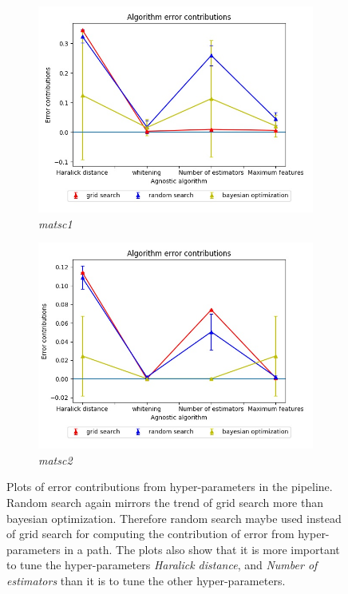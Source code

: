 \begin{figure}[ht!]
\begin{subfigure}{.5\textwidth}
  \centering
  \includegraphics[scale=0.37]{img/EP/agnostic_error_hyper_matsc_dataset1}
  \caption{\textit{matsc1}}
  \label{fig:sfig3}
\end{subfigure}%
\begin{subfigure}{.5\textwidth}
  \centering
  \includegraphics[scale=0.37]{img/EP/agnostic_error_hyper_matsc_dataset2}
  \caption{\textit{matsc2}}
  \label{fig:sfig4}
\end{subfigure}

\caption{Plots of error contributions from hyper-parameters in the pipeline. Random search again mirrors the trend of grid search more than bayesian optimization. Therefore random search maybe used instead of grid search for computing the contribution of error from hyper-parameters in a path. The plots also show that it is more important to tune the hyper-parameters \textit{Haralick distance}, and \textit{Number of estimators} than it is to tune  the other hyper-parameters.}
\label{fig:eq_hyper}
\end{figure}



